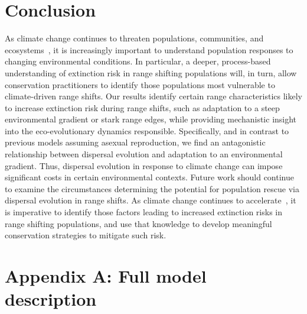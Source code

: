 \documentclass[11pt]{article}
\begin{document}
\section*{Conclusion}
As climate change continues to threaten populations, communities, and ecosystems~\citep{chen2011rapid, hobbs2009novel, gonzalez2010global}, it is increasingly important to understand population responses to changing environmental conditions. In particular, a deeper, process-based understanding of extinction risk in range shifting populations will, in turn, allow conservation practitioners to identify those populations most vulnerable to climate-driven range shifts. Our results identify certain range characteristics likely to increase extinction risk during range shifts, such as adaptation to a steep environmental gradient or stark range edges, while providing mechanistic insight into the eco-evolutionary dynamics responsible. Specifically, and in contrast to previous models assuming asexual reproduction, we find an antagonistic relationship between dispersal evolution and adaptation to an environmental gradient. Thus, dispersal evolution in response to climate change can impose significant costs in certain environmental contexts. Future work should continue to examine the circumstances determining the potential for population rescue via dispersal evolution in range shifts. As climate change continues to accelerate~\citep{chen2017increasing}, it is imperative to identify those factors leading to increased extinction risks in range shifting populations, and use that knowledge to develop meaningful conservation strategies to mitigate such risk.



\newpage{}

\section*{Appendix A: Full model description}
\end{document}
